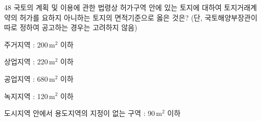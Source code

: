 \begin{question}{48}
국토의 계획 및 이용에 관한 법령상 허가구역 안에 있는 토지에 대하여 토지거래계약의 허가를 요하지 아니하는 토지의 면적기준으로 옳은 것은? (단, 국토해양부장관이 따로 정하여 공고하는 경우는 고려하지 않음)
\begin{choices}
  \item 주거지역 : 200\,m$^2$ 이하
  \item 상업지역 : 220\,m$^2$ 이하
  \item 공업지역 : 680\,m$^2$ 이하
  \item 녹지지역 : 120\,m$^2$ 이하
  \item 도시지역 안에서 용도지역의 지정이 없는 구역 : 90\,m$^2$ 이하
\end{choices}
\end{question}

